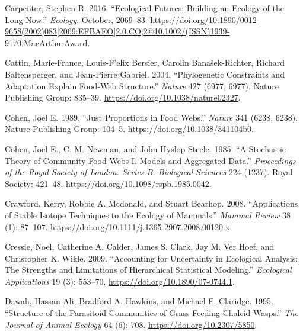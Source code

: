 \documentclass{article}
\begin{document}
\leavevmode\hypertarget{ref-carpenterEcologicalFuturesBuilding2016}{}%
Carpenter, Stephen R. 2016. ``Ecological Futures: Building an Ecology of
the Long Now.'' \emph{Ecology}, October, 2069--83.
\href{https://doi.org/10.1890/0012-9658(2002)083\%5B2069:EFBAEO\%5D2.0.CO;2@10.1002/(ISSN)1939-9170.MacArthurAward}{https://doi.org/10.1890/0012-9658(2002)083{[}2069:EFBAEO{]}2.0.CO;2@10.1002/(ISSN)1939-9170.MacArthurAward}.

\leavevmode\hypertarget{ref-cattinPhylogeneticConstraintsAdaptation2004}{}%
Cattin, Marie-France, Louis-F\a'elix Bersier, Carolin Banašek-Richter,
Richard Baltensperger, and Jean-Pierre Gabriel. 2004. ``Phylogenetic
Constraints and Adaptation Explain Food-Web Structure.'' \emph{Nature}
427 (6977, 6977). Nature Publishing Group: 835--39.
\url{https://doi.org/10.1038/nature02327}.

\leavevmode\hypertarget{ref-cohenJustProportionsFood1989}{}%
Cohen, Joel E. 1989. ``Just Proportions in Food Webs.'' \emph{Nature}
341 (6238, 6238). Nature Publishing Group: 104--5.
\url{https://doi.org/10.1038/341104b0}.

\leavevmode\hypertarget{ref-cohenStochasticTheoryCommunity1985}{}%
Cohen, Joel E., C. M. Newman, and John Hyslop Steele. 1985. ``A
Stochastic Theory of Community Food Webs I. Models and Aggregated
Data.'' \emph{Proceedings of the Royal Society of London. Series B.
Biological Sciences} 224 (1237). Royal Society: 421--48.
\url{https://doi.org/10.1098/rspb.1985.0042}.

\leavevmode\hypertarget{ref-crawfordApplicationsStableIsotope2008}{}%
Crawford, Kerry, Robbie A. Mcdonald, and Stuart Bearhop. 2008.
``Applications of Stable Isotope Techniques to the Ecology of Mammals.''
\emph{Mammal Review} 38 (1): 87--107.
\url{https://doi.org/10.1111/j.1365-2907.2008.00120.x}.

\leavevmode\hypertarget{ref-cressieAccountingUncertaintyEcological2009}{}%
Cressie, Noel, Catherine A. Calder, James S. Clark, Jay M. Ver Hoef, and
Christopher K. Wikle. 2009. ``Accounting for Uncertainty in Ecological
Analysis: The Strengths and Limitations of Hierarchical Statistical
Modeling.'' \emph{Ecological Applications} 19 (3): 553--70.
\url{https://doi.org/10.1890/07-0744.1}.

\leavevmode\hypertarget{ref-dawahStructureParasitoidCommunities1995}{}%
Dawah, Hassan Ali, Bradford A. Hawkins, and Michael F. Claridge. 1995.
``Structure of the Parasitoid Communities of Grass-Feeding Chalcid
Wasps.'' \emph{The Journal of Animal Ecology} 64 (6): 708.
\url{https://doi.org/10.2307/5850}.
\end{document}
